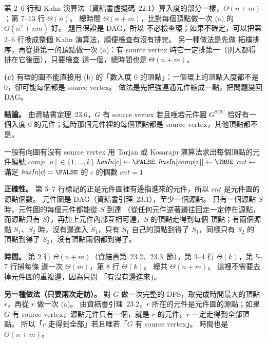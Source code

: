 \begin{pastsoln}
第 2--6 行和 Kahn 演算法（資結書虛擬碼~22.1）算入度的部分一樣，$\Theta(n + m)$；第 7--13 行
$\Theta(n)$。 總時間 $\Theta(n + m)$，比對每個頂點做一次 (a) 的 $O(n^2 + nm)$ 好。 題目保證是 DAG，所以
不必檢查環；如果不確定，可以把第 2--6 行換成整個 Kahn 演算法，順便檢查有沒有排完。 另一種做法是先做
拓樸排序，再從排第一的頂點做一次 (a)：有 source vertex 時它一定排第一（別人都得排在它後面），只要檢查
這一個，總時間也是 $\Theta(n + m)$。

\textbf{(c)} 有環的圖不能直接用 (b) 的「數入度 $0$ 的頂點」：一個環上的頂點入度都不是 $0$，卻可能每個都是
source vertex。 做法是先把強連通元件縮成一點，把問題變回 DAG。

\textbf{結論。} 由資結書定理~23.6，$G$ 有 source vertex 若且唯若元件圖 $G^{\mathrm{SCC}}$ 恰好有一個入度
$0$ 的元件；這時那個元件裡的每個頂點都是 source vertex，其他頂點都不是。

\begin{pseudo}{一般有向圖有沒有 source vertex}
    \State 用 Tarjan 或 Kosaraju 演算法求出每個頂點的元件編號 $\mathit{comp}[u] \in \{1, \ldots, k\}$
        \State $\mathit{hasIn}[c] \gets \FALSE$
    \EndFor
            \State $\mathit{hasIn}[\mathit{comp}[v]] \gets \TRUE$
        \EndIf
    \EndFor
    \State $\mathit{cnt} \gets$ 滿足 $\mathit{hasIn}[c] = \FALSE$ 的 $c$ 的個數
    \State \Return $\mathit{cnt} = 1$
\EndFunction
\end{pseudo}

\textbf{正確性。} 第 5--7 行標記的正是元件圖裡有邊指進來的元件，所以 $\mathit{cnt}$ 是元件圖的源點個數。
元件圖是 DAG（資結書引理~23.1），至少一個源點。 只有一個源點 $S$ 時，元件圖的每個元件都能從 $S$ 到達
（從任何元件逆著邊往回走一定停在源點，而源點只有 $S$），再加上元件內部互相可達，$S$ 的頂點走得到每個
頂點；有兩個源點 $S_1$、$S_2$ 時，沒有邊進入 $S_1$，只有 $S_1$ 自己的頂點到得了 $S_1$，同樣只有 $S_2$ 的
頂點到得了 $S_2$，沒有頂點兩個都到得了。

\textbf{時間。} 第 2 行 $\Theta(n + m)$（資結書第~23.2、23.3~節），第 3--4 行 $\Theta(k)$，第 5--7 行掃每條
邊一次 $\Theta(m)$，第 8 行 $\Theta(k)$。 總共 $\Theta(n + m)$。 這裡不需要去掉元件圖的重複邊，因為只問
「有沒有邊進來」。

\textbf{另一種做法（只要兩次走訪）。} 對 $G$ 做一次完整的 DFS，取完成時間最大的頂點 $r$，再從 $r$ 做一次
(a)。 由資結書引理~23.2，$r$ 所在的元件是元件圖的源點；如果 $G$ 有 source vertex，源點元件只有一個，就是
$r$ 的元件，$r$ 一定走得到全部頂點。 所以「$r$ 走得到全部」若且唯若「$G$ 有 source vertex」。 時間也是
$\Theta(n + m)$。
\end{pastsoln}
